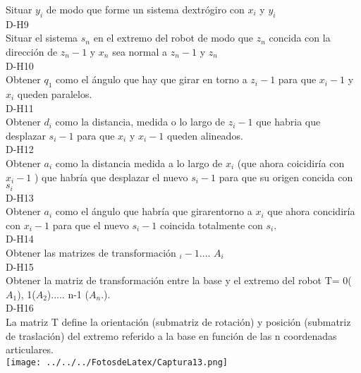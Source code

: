 \documentclass[12pt]{article}
\begin{document}
Situar $ y_i $ de modo que forme un sistema dextrógiro con $ x_i $ y $ y_i $\\
D-H9\\
Situar el sistema $ s_n $ en el extremo del robot de modo que $ z_n $ concida con la dirección de $ z_n-1 $ y $ x_n $ sea normal a $ z_n-1 $ y $ z_n $\\
D-H10\\
Obtener $ q_1 $ como el ángulo que hay que girar en torno a $ z_i-1 $ para que $ x_i-1$ y $x_i$ queden paralelos.\\
D-H11\\
Obtener $d_i$ como la distancia, medida o lo largo de $z_i-1$ que habria que desplazar $s_i-1$ para que $x_i$ y     $x_i-1$ queden alineados.\\
D-H12\\
Obtener $a_i$ como la distancia medida a lo largo de $x_i$ (que ahora coicidiría con $x_i-1$ ) que habría que desplazar el nuevo $s_i-1$ para que su origen concida con $s_i$\\
D-H13\\
Obtener $a_i$ como el ángulo que habría que girarentorno a $x_i$ que ahora concidiría con $x_i-1$ para que el nuevo $s_i-1$ coincida totalmente con $s_i$.\\
D-H14\\
Obtener las matrizes de transformación $_i-1 $.... $ A_i$\\
D-H15\\
Obtener la matriz de transformación entre la base y el extremo del robot T= 0($A_1$), 1($A_2$)..... n-1 ($A_n.$).\\
D-H16\\
La matriz T define la orientación (submatriz de rotación) y posición (submatriz de traslación) del extremo referido  a la base en función de las n coordenadas articulares.\\
\texttt{[image: ../../../FotosdeLatex/Captura13.png]}  

\pagebreak
\nocite{*} 


 
\end{document}
